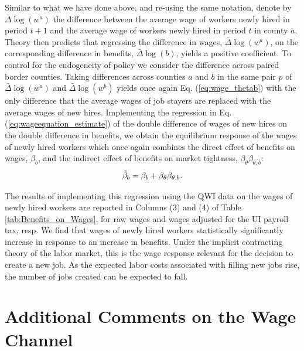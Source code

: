 \documentclass[12pt]{article}
\newcommand{\1}{\mathbf{1}}
\newcommand{\beq}{\begin{eqnarray}}
\newcommand{\eeq}{\end{eqnarray}}
\begin{document}
\begin{appendix}
Similar to what we have done above, and re-using the same notation, denote by $\bar{\Delta} \log(w^a)$ the difference between the average wage of workers newly hired in period $t+1$ and the average wage of workers newly hired in period $t$ in county $a$. Theory then predicts that regressing the difference in wages, $\bar{\Delta} \log(w^a)$, on the corresponding difference in benefits, $\bar{\Delta} \log(b)$, yields a positive coefficient. To control for the endogeneity of policy we consider the difference across paired border counties. Taking differences across counties $a$ and $b$ in the same pair $p$ of $\bar{\Delta}\log(w^a)$ and $\bar{\Delta}\log(w^b)$ yields once again Eq. (\ref{eq:wage_thetab}) with the only difference that the average wages of job stayers are replaced with the average wages of new hires. Implementing the regression in Eq. (\ref{eq:wageequation_estimate}) of the double difference of wages of new hires on the double difference in benefits, we obtain the equilibrium response of the wages of newly hired workers which once again combines the direct effect of benefits on wages, $\beta_b$, and the indirect effect of benefits on market tightness, $\beta_{\theta} \beta_{\theta,b}$:
\beq
\tilde{\beta}_b = \beta_b + \beta_{\theta} \beta_{\theta,b}. \notag
\eeq

The results of implementing this regression using the QWI data on the wages of newly hired workers are reported in Columns (3) and (4) of Table \ref{tab:Benefits_on_Wages}, for raw wages and wages adjusted for the UI payroll tax, resp. We find that wages of newly hired workers statistically significantly increase in response to an increase in benefits. Under the implicit contracting theory of the labor market, this is the wage response relevant for the decision to create a new job. As the expected labor costs associated with filling new jobs rise, the number of jobs created can be expected to fall.



\section{Additional Comments on the Wage Channel}
\label{app:wage_channel}


\end{appendix}
\end{document}
